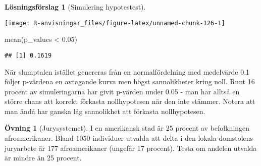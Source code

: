 \documentclass[
]{book}
\newenvironment{Shaded}{\begin{snugshade}}{\end{snugshade}}
\newcommand{\AttributeTok}[1]{\textcolor[rgb]{0.77,0.63,0.00}{#1}}
\newcommand{\ControlFlowTok}[1]{\textcolor[rgb]{0.13,0.29,0.53}{\textbf{#1}}}
\newcommand{\DecValTok}[1]{\textcolor[rgb]{0.00,0.00,0.81}{#1}}
\newcommand{\FloatTok}[1]{\textcolor[rgb]{0.00,0.00,0.81}{#1}}
\newcommand{\FunctionTok}[1]{\textcolor[rgb]{0.00,0.00,0.00}{#1}}
\newcommand{\NormalTok}[1]{#1}
\newcommand{\OtherTok}[1]{\textcolor[rgb]{0.56,0.35,0.01}{#1}}
\newcommand{\SpecialCharTok}[1]{\textcolor[rgb]{0.00,0.00,0.00}{#1}}
\theoremstyle{definition}
\theoremstyle{definition}
\theoremstyle{definition}
\newtheorem{exercise}{Övning}[chapter]
\theoremstyle{definition}
\newtheorem{hypothesis}{Lösningsförslag}[chapter]
\theoremstyle{remark}
\begin{document}
\begin{hypothesis}[Simulering hypotestest]
\begin{Shaded}
\end{Shaded}

\begin{center}\texttt{[image: R-anvisningar\_files/figure-latex/unnamed-chunk-126-1]} \end{center}

\begin{Shaded}
\begin{Highlighting}[]
\FunctionTok{mean}\NormalTok{(p\_values }\SpecialCharTok{\textless{}} \FloatTok{0.05}\NormalTok{)}
\end{Highlighting}
\end{Shaded}

\begin{verbatim}
## [1] 0.1619
\end{verbatim}

När slumptalen istället genereras från en normalfördelning med medelvärde 0.1 följer p-värdena en avtagande kurva men högst sannolikheter kring noll. Runt 16 procent av simuleringarna har givit p-värden under 0.05 - man har alltså en större chans att korrekt förkasta nollhypotesen när den inte stämmer. Notera att man ändå har ganska låg sannolikhet att förkasta nollhypotesen.
\end{hypothesis}

\begin{exercise}[Jurysystemet]
I en amerikansk stad är 25 procent av befolkningen afroamerikaner. Bland 1050 individuer utvalda att delta i den lokala domstolens juryarbete är 177 afroamerikaner (ungefär 17 procent). Testa om andelen utvalda är mindre än 25 procent.
\end{exercise}
\end{document}
